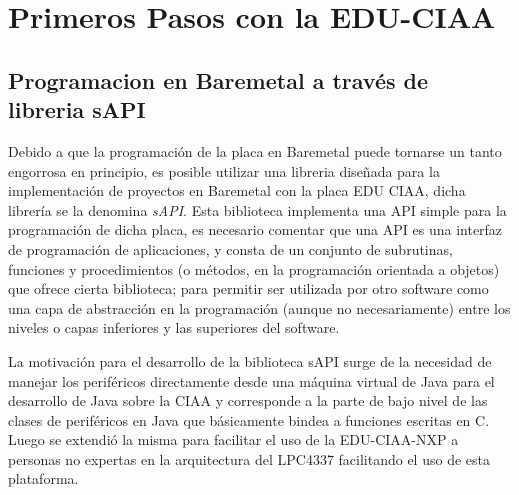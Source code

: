 \documentclass[12pt,letterpaper]{article}
\begin{document}
\section{Primeros Pasos con la EDU-CIAA}

\subsection{Programacion en Baremetal a través de libreria sAPI}\label{programacionbaremetal}
Debido a que la programación de la placa en Baremetal puede tornarse un tanto engorrosa en principio, es posible utilizar una libreria diseñada para la implementación de proyectos en Baremetal con la placa EDU CIAA, dicha librería se la denomina \textit{sAPI}. Esta biblioteca implementa una API simple para la programación de dicha placa, es necesario comentar que una API es una interfaz de programación de aplicaciones, y consta de un conjunto de subrutinas, funciones y procedimientos (o métodos, en la programación orientada a objetos) que ofrece cierta biblioteca; para permitir ser utilizada por otro software como una capa de abstracción en la programación (aunque no necesariamente) entre los niveles o capas inferiores y las superiores del software\cite{sapi}.

La motivación para el desarrollo de la biblioteca sAPI surge de la necesidad de manejar los periféricos directamente desde una máquina virtual de Java para el desarrollo de Java sobre la CIAA y corresponde a la parte de bajo nivel de las clases de periféricos en Java que básicamente bindea a funciones escritas en C.
Luego se extendió la misma para facilitar el uso de la EDU-CIAA-NXP a personas no expertas en la arquitectura del LPC4337 facilitando el uso de esta plataforma.
\end{document}
